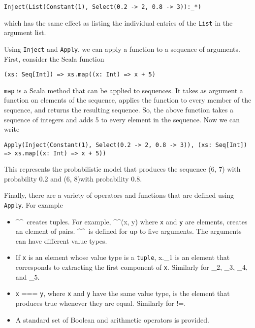 \begin{flushleft}
\texttt{Inject(List(Constant(1), Select(0.2 -> 2, 0.8 -> 3)):\_*)}
\end{flushleft}

which has the same effect as listing the individual entries of the \texttt{List} in the argument list.

Using \texttt{Inject} and \texttt{Apply}, we can apply a function to a sequence of arguments. First, consider the Scala function

\begin{flushleft}
\texttt{(xs: Seq[Int]) => xs.map((x: Int) => x + 5)}
\end{flushleft}

\texttt{map} is a Scala method that can be applied to sequences. It takes as argument a function on elements of the sequence, applies the function to every member of the sequence, and returns the resulting sequence. So, the above function takes a sequence of integers and adds 5 to every element in the sequence. Now we can write

\begin{flushleft}
\texttt{Apply(Inject(Constant(1), Select(0.2 -> 2, 0.8 -> 3)), 
\newline \tab (xs: Seq[Int]) => xs.map((x: Int) => x + 5))}
\end{flushleft}

This represents the probabilistic model that produces the sequence (6, 7) with probability 0.2 and (6, 8)with probability 0.8.


Finally, there are a variety of operators and functions that are defined using \texttt{Apply}. For example
\begin{itemize}
\item \textasciicircum \textasciicircum \ creates tuples. For example, \textasciicircum \textasciicircum(x, y) where \texttt{x} and \texttt{y} are elements, creates an element of pairs. \textasciicircum \textasciicircum \ is defined for up to five arguments. The arguments can have different value types.
\item If \texttt{x} is an element whose value type is a \texttt{tuple}, x.\_1 is an element that corresponds to extracting the first component of \texttt{x}. Similarly for \_2, \_3, \_4, and \_5.
\item \texttt{x} === \texttt{y}, where \texttt{x} and \texttt{y} have the same value type, is the element that produces true whenever they are equal. Similarly for !=.
\item A standard set of Boolean and arithmetic operators is provided.
\end{itemize}




